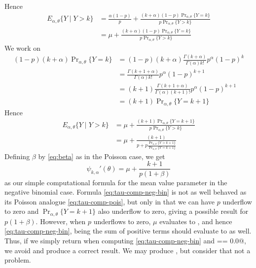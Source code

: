 \documentclass[11pt]{article}
\newcommand{\Prsub}[1]{\Pr\nolimits_{#1}}
\begin{document}
Hence
\begin{equation} \label{eq:tau-comp-one}
\begin{split}
   E_{\alpha, \theta}\{ Y \mid Y > k \}
   & =
   \frac{\alpha (1 - p)}{p}
   +
   \frac{(k + \alpha) (1 - p) \Prsub{\alpha, \theta} \{ Y = k \}}
   {p \Prsub{\alpha, \theta} \{ Y > k \}}
   \\
   & =
   \mu +
   \frac{(k + \alpha) (1 - p) \Prsub{\alpha, \theta} \{ Y = k \}}
   {p \Prsub{\alpha, \theta} \{ Y > k \}}
\end{split}
\end{equation}
We work on
\begin{align*}
   (1 - p) (k + \alpha) \Prsub{\alpha, \theta} \{Y = k\}
   & =
   (1 - p) (k + \alpha)
   \frac{\Gamma(k + \alpha)}{\Gamma(\alpha) k !} p^\alpha (1 - p)^k
   \\
   & =
   \frac{\Gamma(k + 1 + \alpha)}{\Gamma(\alpha) k !} p^\alpha (1 - p)^{k + 1}
   \\
   & =
   (k + 1) \frac{\Gamma(k + 1 + \alpha)}{\Gamma(\alpha) (k + 1) !}
   p^\alpha (1 - p)^{k + 1}
   \\
   & =
   (k + 1) \Prsub{\alpha, \theta} \{ Y = k + 1 \}
\end{align*}
Hence
\begin{align*}
   E_{\alpha, \theta}\{ Y \mid Y > k \}
   & =
   \mu +
   \frac{(k + 1) \Prsub{\alpha, \theta} \{ Y = k + 1 \}}
   {p \Prsub{\alpha, \theta} \{ Y > k \}}
   \\
   & =
   \mu +
   \frac{(k + 1)}
   {p + p \frac{\Prsub{\alpha, \theta} \{ Y > k + 1 \}}
   {\Prsub{\alpha, \theta} \{ Y = k + 1 \}}}
\end{align*}
Defining $\beta$ by \eqref{eq:beta} as in the Poisson case, we get
\begin{equation} \label{eq:tau-comp-neg-bin}
   \psi_{k, \alpha}'(\theta) = \mu + \frac{k + 1}{p (1 + \beta)}
\end{equation}
as our simple computational formula for the mean value parameter
in the negative binomial case.
Formula \eqref{eq:tau-comp-neg-bin} is not as well behaved as
its Poisson analogue \eqref{eq:tau-comp-pois}, but only in that we
can have $p$ underflow to zero and $\Prsub{\alpha, \theta} \{ Y = k + 1 \}$
also underflow to zero, giving a possible \verb@NaN@ result
for $p (1 + \beta)$.  However, when $p$ underflows to zero,
$\mu$ evaluates to \verb@Inf@, and hence \eqref{eq:tau-comp-neg-bin},
being the sum of positive terms should evaluate to \verb@Inf@ as well.
Thus, if we simply return \verb@Inf@ when computing \eqref{eq:tau-comp-neg-bin}
and \verb@p == 0.0@, we avoid \verb@NaN@ and produce a correct result.
We may produce \verb@Inf@, but consider that not a problem.
\end{document}
